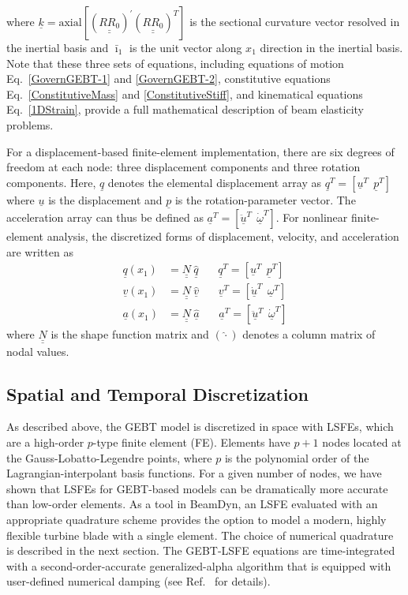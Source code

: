 \documentclass{aiaa-tc}
\newcommand{\tens}[1]{\underline{\underline{#1}}}
\renewcommand{\vec}[1]{\underline{#1}}
\begin{document}
where $\vec{k} = \mathrm{axial}[(\tens{R R_0})^\prime (\tens{R R_0})^T]$ is the sectional
curvature vector resolved in the inertial basis and $\bar{\imath}_1$ is the unit
vector along $x_1$ direction in the inertial basis. Note that these
three sets of equations, including equations of motion
Eq.~\eqref{GovernGEBT-1} and \eqref{GovernGEBT-2}, constitutive equations
Eq.~\eqref{ConstitutiveMass} and \eqref{ConstitutiveStiff}, and kinematical
equations Eq.~\eqref{1DStrain}, provide a full mathematical description of beam elasticity problems. 

For a displacement-based finite-element implementation, there are six
degrees of freedom at each node: three displacement components and three
rotation components. Here, $\vec{q}$ denotes the elemental
displacement array as $\underline{q}^T=\left[
\underline{u}^T~~\underline{p}^T\right]$ where $\vec{u}$ is the
displacement and $\vec{p}$ is the rotation-parameter vector. The
acceleration array can thus be defined as $\underline{a}^T=\left[
\ddot{\underline{u}}^T~~ \dot{\underline{\omega}}^T \right]$. For nonlinear
finite-element analysis, the discretized forms of
displacement, velocity, and acceleration are written as
\begin{align}
	\label{DiscretizedDisp}
	\underline{q} (x_1) &= \underline{\underline{N}} ~\hat{\underline{q}}~~~~~~~~\underline{q}^T = \left[ \underline{u}^T~~\underline{p}^T \right] \\
	\label{DiscretizedVel}
	\underline{v}(x_1) &= \underline{\underline{N}}~\hat{\underline{v}}~~~~~~~~\underline{v}^T = \left[\underline{\dot{u}}^T~~\underline{\omega}^T \right] \\
	\label{DiscretizedAcc}
	\underline{a}(x_1) &= \underline{\underline{N}}~ \hat{\underline{a}}~~~~~~~~\underline{a}^T = \left[ \ddot{\underline{u}}^T~~\dot{\underline{\omega}}^T \right]	
\end{align}
where $\tens{N}$ is the shape function matrix and $(\hat{\cdot})$ denotes a
column matrix of nodal values.

\subsection{Spatial and Temporal Discretization}

As described above, the GEBT model is discretized in space with LSFEs\cite{Ronquist-Patera:1987}, which are a high-order $p$-type finite element (FE).   
Elements have $p+1$ nodes located at the Gauss-Lobatto-Legendre points, where $p$ is the polynomial order of the Lagrangian-interpolant basis functions.  
For a given number of nodes, we have shown\cite{Wang:SFE2013,Wang:GEBT2014} that LSFEs for GEBT-based models can be dramatically more accurate than low-order elements.   
As a tool in BeamDyn, an LSFE evaluated with an appropriate quadrature scheme provides the option to model a modern, highly flexible turbine blade with a single element.  
The choice of numerical quadrature is described in the next section.
The GEBT-LSFE equations are time-integrated with a second-order-accurate generalized-alpha algorithm that is equipped with user-defined numerical damping (see Ref.~\cite{Wang:GEBT2014} for details).  
\end{document}
